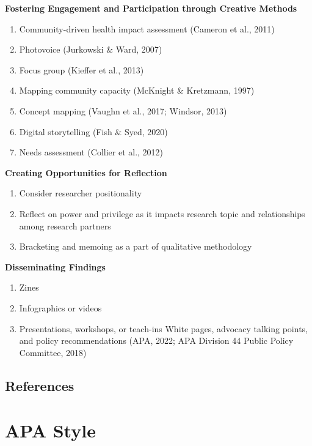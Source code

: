 \documentclass[
  11pt,
]{book}
\providecommand{\tightlist}{%
  \setlength{\itemsep}{0pt}\setlength{\parskip}{0pt}}
\begin{document}
\textbf{Fostering Engagement and Participation through Creative Methods}

\begin{enumerate}
\def\labelenumi{\arabic{enumi}.}
\tightlist
\item
  Community-driven health impact assessment (Cameron et al., 2011)
\item
  Photovoice (Jurkowski \& Ward, 2007)
\item
  Focus group (Kieffer et al., 2013)
\item
  Mapping community capacity (McKnight \& Kretzmann, 1997)
\item
  Concept mapping (Vaughn et al., 2017; Windsor, 2013)
\item
  Digital storytelling (Fish \& Syed, 2020)
\item
  Needs assessment (Collier et al., 2012)
\end{enumerate}

\textbf{Creating Opportunities for Reflection}

\begin{enumerate}
\def\labelenumi{\arabic{enumi}.}
\tightlist
\item
  Consider researcher positionality
\item
  Reflect on power and privilege as it impacts research topic and relationships among research partners
\item
  Bracketing and memoing as a part of qualitative methodology
\end{enumerate}

\textbf{Disseminating Findings}

\begin{enumerate}
\def\labelenumi{\arabic{enumi}.}
\tightlist
\item
  Zines
\item
  Infographics or videos
\item
  Presentations, workshops, or teach-ins
  White pages, advocacy talking points, and policy recommendations (APA, 2022; APA Division 44 Public Policy Committee, 2018)
\end{enumerate}

\hypertarget{references-1}{%
\section{References}\label{references-1}}

\hypertarget{APAstyle}{%
\chapter{APA Style}\label{APAstyle}}
\end{document}
